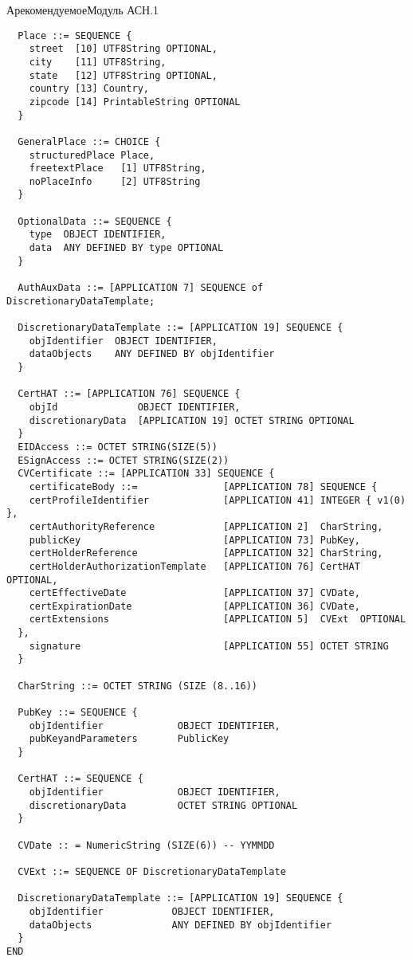 \begin{appendix}{А}{рекомендуемое}{Модуль АСН.1}
\begin{verbatim}
  Place ::= SEQUENCE {
    street  [10] UTF8String OPTIONAL,
    city    [11] UTF8String,
    state   [12] UTF8String OPTIONAL,
    country [13] Country,
    zipcode [14] PrintableString OPTIONAL
  }
  
  GeneralPlace ::= CHOICE {
    structuredPlace Place,
    freetextPlace   [1] UTF8String,
    noPlaceInfo     [2] UTF8String
  }
  
  OptionalData ::= SEQUENCE {
    type  OBJECT IDENTIFIER,
    data  ANY DEFINED BY type OPTIONAL
  }

  AuthAuxData ::= [APPLICATION 7] SEQUENCE of DiscretionaryDataTemplate;

  DiscretionaryDataTemplate ::= [APPLICATION 19] SEQUENCE {
    objIdentifier  OBJECT IDENTIFIER,
    dataObjects    ANY DEFINED BY objIdentifier
  }

  CertHAT ::= [APPLICATION 76] SEQUENCE {
    objId              OBJECT IDENTIFIER,
    discretionaryData  [APPLICATION 19] OCTET STRING OPTIONAL
  }
  EIDAccess ::= OCTET STRING(SIZE(5))
  ESignAccess ::= OCTET STRING(SIZE(2))
  CVCertificate ::= [APPLICATION 33] SEQUENCE {
    certificateBody ::=               [APPLICATION 78] SEQUENCE {
    certProfileIdentifier             [APPLICATION 41] INTEGER { v1(0) },
    certAuthorityReference            [APPLICATION 2]  CharString,
    publicKey                         [APPLICATION 73] PubKey,
    certHolderReference               [APPLICATION 32] CharString,
    certHolderAuthorizationTemplate   [APPLICATION 76] CertHAT  OPTIONAL,
    certEffectiveDate                 [APPLICATION 37] CVDate,
    certExpirationDate                [APPLICATION 36] CVDate,
    certExtensions                    [APPLICATION 5]  CVExt  OPTIONAL
  },
    signature                         [APPLICATION 55] OCTET STRING
  }

  CharString ::= OCTET STRING (SIZE (8..16))

  PubKey ::= SEQUENCE {
    objIdentifier             OBJECT IDENTIFIER,
    pubKeyandParameters       PublicKey 
  }

  CertHAT ::= SEQUENCE {
    objIdentifier             OBJECT IDENTIFIER,
    discretionaryData         OCTET STRING OPTIONAL
  }

  CVDate :: = NumericString (SIZE(6)) -- YYMMDD

  CVExt ::= SEQUENCE OF DiscretionaryDataTemplate

  DiscretionaryDataTemplate ::= [APPLICATION 19] SEQUENCE {
    objIdentifier            OBJECT IDENTIFIER,
    dataObjects              ANY DEFINED BY objIdentifier
  }
END
\end{verbatim}

\end{appendix}
